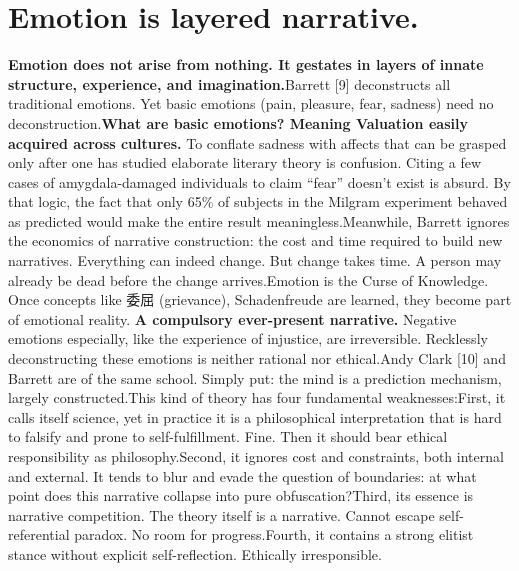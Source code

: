 \documentclass[11pt]{article}
\renewcommand{\\}[1][\mynewlineskip]{\oldnewline[#1]}
\begin{document}
\section{Emotion is layered narrative.}
\textbf{Emotion does not arise from nothing. It gestates in layers of innate structure, experience, and imagination.}\\
Barrett [9] deconstructs all traditional emotions. Yet basic emotions (pain, pleasure, fear, sadness) need no deconstruction.\\
\textbf{What are basic emotions? Meaning Valuation easily acquired across cultures.} To conflate sadness with affects that can be grasped only after one has studied elaborate literary theory is confusion. Citing a few cases of amygdala-damaged individuals to claim ``fear'' doesn't exist is absurd. By that logic, the fact that only 65\% of subjects in the Milgram experiment behaved as predicted would make the entire result meaningless.\\
Meanwhile, Barrett ignores the economics of narrative construction: the cost and time required to build new narratives. Everything can indeed change. But change takes time. A person may already be dead before the change arrives.\\
Emotion is the Curse of Knowledge. Once concepts like 委屈 (grievance), Schadenfreude are learned, they become part of emotional reality. \textbf{A compulsory ever-present narrative.} Negative emotions especially, like the experience of injustice, are irreversible. Recklessly deconstructing these emotions is neither rational nor ethical.\\
Andy Clark [10] and Barrett are of the same school. Simply put: the mind is a prediction mechanism, largely constructed.\\
This kind of theory has four fundamental weaknesses:\\
First, it calls itself science, yet in practice it is a philosophical interpretation that is hard to falsify and prone to self-fulfillment. Fine. Then it should bear ethical responsibility as philosophy.\\
Second, it ignores cost and constraints, both internal and external. It tends to blur and evade the question of boundaries: at what point does this narrative collapse into pure obfuscation?\\
Third, its essence is narrative competition. The theory itself is a narrative. Cannot escape self-referential paradox. No room for progress.\\
Fourth, it contains a strong elitist stance without explicit self-reflection. Ethically irresponsible.\\
\end{document}

